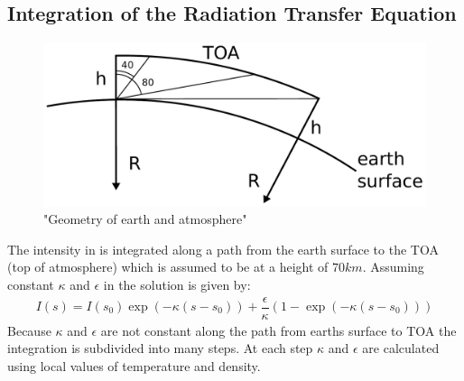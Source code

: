 \subsection{Integration of the Radiation Transfer Equation}

\begin{figure}[ht]
	\includegraphics[width=12cm]{figures/earth_surface_toa.pdf}
	\caption{"Geometry of earth and atmosphere"}
	\label{fig:geometry}
\end{figure}

The intensity in  is integrated along a path from the earth surface to the TOA (top of atmosphere) which is assumed to be at a height of $70 km$. Assuming constant $\kappa$ and $\epsilon$ in  the solution is given by:
\begin{align}
	I(s) = I(s_0) \exp( -  \kappa (s-s_0)) + \dfrac{\epsilon}{\kappa} \left(1 - \exp( - \kappa (s-s_0))\right)
\end{align}
Because $\kappa$ and $\epsilon$ are not constant along the path from earths surface to TOA the integration is subdivided into many steps. At each step $\kappa$ and $\epsilon$ are calculated using local values of temperature and density.


